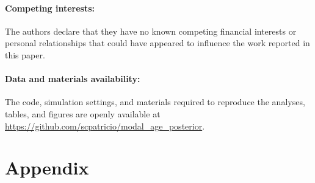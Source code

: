 \documentclass[12pt, letterpaper]{article}
\begin{document}

\paragraph*{Competing interests:} The authors declare that they have no known competing financial interests or personal relationships that could have appeared to influence the work reported in this paper.

\paragraph*{Data and materials availability:} The code, simulation settings, and materials required to reproduce the analyses, tables, and figures are openly available at \url{https://github.com/scpatricio/modal_age_posterior}.



{\footnotesize


}

\clearpage



\renewcommand{\thefigure}{S\arabic{figure}}
\renewcommand{\thetable}{S\arabic{table}}
\renewcommand{\theequation}{S\arabic{equation}}
\renewcommand{\thepage}{S\arabic{page}}
\setcounter{figure}{0}
\setcounter{table}{0}
\setcounter{equation}{0}
\setcounter{page}{1} %

\appendix
\section*{Appendix}
\end{document}
